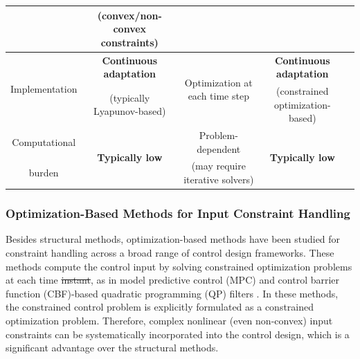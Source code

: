 \documentclass[letterpaper, journal]{IEEEtran}
\providecommand{\DIFadd}[1]{{\protect\color{blue}\uwave{#1}}} %
\providecommand{\DIFdel}[1]{{\protect\color{red}\sout{#1}}} %
\providecommand{\DIFaddbegin}{} %
\providecommand{\DIFaddend}{} %
\providecommand{\DIFdelbegin}{} %
\providecommand{\DIFdelend}{} %
\providecommand{\DIFaddbeginFL}{} %
\providecommand{\DIFaddendFL}{} %
\providecommand{\DIFdelbeginFL}{} %
\providecommand{\DIFdelendFL}{} %
\begin{document}
\begin{table}[t]
\begin{tabular}{c c c c c }
  &
  (convex/non-convex constraints)
  &
  \\
  \hline %
  \multirow{2}{*}{
    Implementation
  }
  &
    \textbf{Continuous adaptation}
  &
  \DIFdelbeginFL %
\DIFdelendFL \DIFaddbeginFL \multirow{2}{*}{
    Optimization at each time step
  }
  \DIFaddendFL &
    \textbf{Continuous adaptation}
  \\
  &
  (typically Lyapunov-based)
  &
  &
  (constrained optimization-based)
  \\
  \hline
    Computational
  &
  \multirow{2}{*}{
    \textbf{Typically low}
  }
  &
  Problem-dependent
  &
  \multirow{2}{*}{
    \textbf{Typically low}
  }
  \\
  burden
  &
  &
  (may require iterative solvers)
  &
  \\
  \hline
  \end{tabular}
  \label{table:intro:comparison}
\end{table}




\subsubsection{Optimization-Based Methods for Input Constraint Handling}

Besides structural methods, optimization-based methods have been studied for constraint handling across a broad range of control design frameworks.
These methods compute the control input by solving constrained optimization problems at each time \DIFdelbegin \DIFdel{instant}\DIFdelend \DIFaddbegin \DIFadd{step}\DIFaddend , as in model predictive control (MPC) \cite{Vahidi-Moghaddam:2025aa,Mallick:2025aa,Khodaverdian:2025aa,Greune:2011aa,Bemporad:1999aa,Berberich:2025aa,Draeger:1995aa} and control barrier function (CBF)-based quadratic programming (QP) filters \cite{Ames:2019aa,Ko:2025aa,Sweatland:2025aa}. 
In these methods, the constrained control problem is explicitly formulated as a constrained optimization problem.
Therefore, complex nonlinear (even non-convex) input constraints can be systematically incorporated into the control design, which is a significant advantage over the structural methods.
\end{document}
